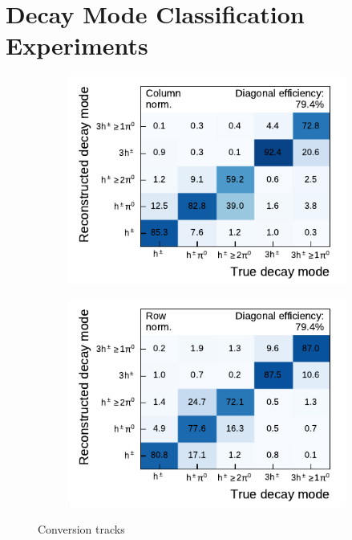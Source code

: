 
\clearpage
\section{Decay Mode Classification Experiments}
\label{sec:app_decay_mode_exp}
\begin{figure}[htb]
  \begin{subfigure}[t]{0.48\textwidth}
    \centering
    \includegraphics{./figures/decay_mode_classification/experiments/mig_mat_conversions.pdf}
  \end{subfigure}\hfill
  \begin{subfigure}[t]{0.48\textwidth}
    \centering
    \includegraphics{./figures/decay_mode_classification/experiments/comp_mat_conversions.pdf}
  \end{subfigure}
  \caption{Conversion tracks}
\end{figure}

